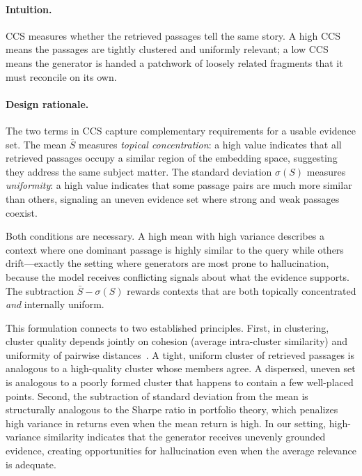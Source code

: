 \paragraph{Intuition.}
CCS measures whether the retrieved passages tell the same story.
A high CCS means the passages are tightly clustered and uniformly
relevant; a low CCS means the generator is handed a patchwork of
loosely related fragments that it must reconcile on its own.

\paragraph{Design rationale.}
The two terms in CCS capture complementary requirements for a usable
evidence set. The mean $\bar{S}$ measures \emph{topical concentration}: a
high value indicates that all retrieved passages occupy a similar region of
the embedding space, suggesting they address the same subject matter. The
standard deviation $\sigma(S)$ measures \emph{uniformity}: a high value
indicates that some passage pairs are much more similar than others,
signaling an uneven evidence set where strong and weak passages coexist.

Both conditions are necessary. A high mean with high variance describes a
context where one dominant passage is highly similar to the query while
others drift---exactly the setting where generators are most prone to
hallucination, because the model receives conflicting signals about what the
evidence supports. The subtraction $\bar{S} - \sigma(S)$ rewards contexts
that are both topically concentrated \emph{and} internally uniform.

This formulation connects to two established principles. First, in
clustering, cluster quality depends jointly on cohesion (average
intra-cluster similarity) and uniformity of pairwise
distances~\citep{reimers2019sbert}. A tight, uniform cluster of retrieved
passages is analogous to a high-quality cluster whose members agree. A
dispersed, uneven set is analogous to a poorly formed cluster that happens
to contain a few well-placed points. Second, the subtraction of standard
deviation from the mean is structurally analogous to the Sharpe ratio in
portfolio theory, which penalizes high variance in returns even when the
mean return is high. In our setting, high-variance similarity indicates
that the generator receives unevenly grounded evidence, creating
opportunities for hallucination even when the average relevance is adequate.


